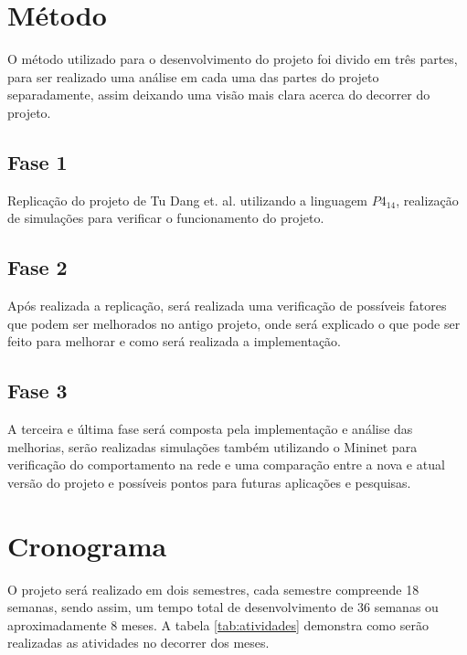 \documentclass[12pt,
openright, 
oneside,
a4paper,
brazil]{facom-ufu-abntex2}
\theoremstyle{definition}
\begin{document}
\section{Método}
O método utilizado para o desenvolvimento do projeto foi divido em três partes, para
ser realizado uma análise em cada uma das partes do projeto separadamente, assim deixando uma
visão mais clara acerca do decorrer do projeto.

\subsection{Fase 1}
Replicação do projeto de Tu Dang et. al. \citep{dang2016paxos} utilizando a linguagem 
$P4_{14}$, realização de simulações para verificar o funcionamento do projeto.

\subsection{Fase 2}
Após realizada a replicação, será realizada uma verificação de possíveis fatores que podem ser 
melhorados no antigo projeto, onde será explicado o que pode ser feito para melhorar e como será
realizada a implementação.

\subsection{Fase 3}
A terceira e última fase será composta pela implementação e análise das melhorias, serão realizadas
simulações também utilizando o Mininet para verificação do comportamento na rede e uma comparação
entre a nova e atual versão do projeto e possíveis pontos para futuras aplicações e pesquisas.

\section{Cronograma}
O projeto será realizado em dois semestres, cada semestre compreende 18 semanas, sendo assim,
um tempo total de desenvolvimento de 36 semanas ou aproximadamente 8 meses. A tabela 
\ref{tab:atividades} demonstra como serão realizadas as atividades no decorrer dos meses. 
\end{document}
